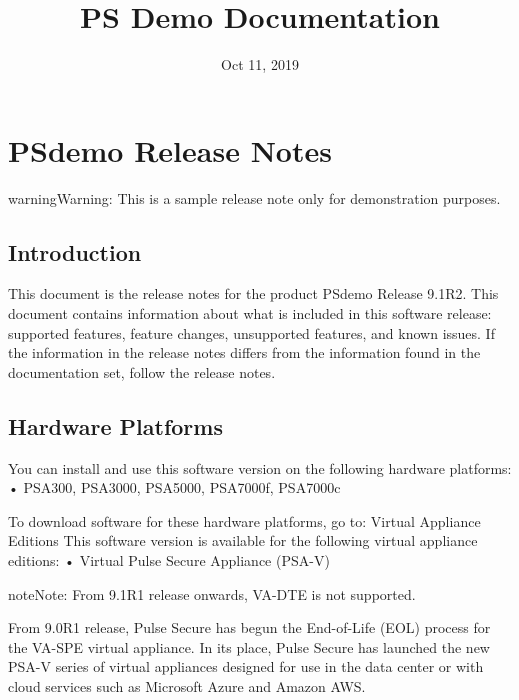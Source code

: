 \documentclass[letterpaper,10pt,english]{sphinxmanual}
\title{PS Demo Documentation}
\date{Oct 11, 2019}
\author{}
\begin{document}
\pagestyle{empty}
\sphinxmaketitle
\pagestyle{plain}
\sphinxtableofcontents
\pagestyle{normal}
\label{\detokenize{index::doc}}



\chapter{PSdemo Release Notes}
\label{\detokenize{relnotes:product-name-release-notes}}\label{\detokenize{relnotes:doc-relnotes}}\label{\detokenize{relnotes::doc}}
\begin{sphinxadmonition}{warning}{Warning:}
This is a sample release note only for demonstration purposes.
\end{sphinxadmonition}



\section{Introduction}
\label{\detokenize{relnotes:introduction}}
This document is the release notes for the product PSdemo Release 9.1R2. This document contains information about what is included in this software release: supported features, feature changes, unsupported features, and known issues. If the information in the release notes differs from the information found in the documentation set, follow the release notes.


\section{Hardware Platforms}
\label{\detokenize{relnotes:hardware-platforms}}
You can install and use this software version on the following hardware platforms: • PSA300, PSA3000, PSA5000, PSA7000f, PSA7000c

To download software for these hardware platforms, go to:  Virtual Appliance Editions
This software version is available for the following virtual appliance editions: • Virtual Pulse Secure Appliance (PSA-V)

\begin{sphinxadmonition}{note}{Note:}
From 9.1R1 release onwards, VA-DTE is not supported.

From 9.0R1 release, Pulse Secure has begun the End-of-Life (EOL) process for the VA-SPE virtual appliance. In its place, Pulse Secure has launched the new PSA-V series of virtual appliances designed for use in the data center or with cloud services such as Microsoft Azure and Amazon AWS.
\end{sphinxadmonition}
\end{document}
